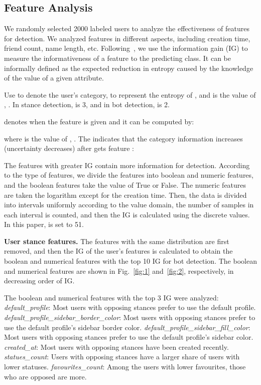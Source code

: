 \documentclass[10pt,twocolumn,letterpaper]{article}
\begin{document}
\subsection{Feature Analysis}
\label{sec:datapre-4}
We randomly selected 2000 labeled users to analyze the effectiveness of features for detection. We analyzed features in different aspects, including creation time, friend count, name length, etc. Following~\cite{Alpher10}, we use the information gain (IG) to measure the informativeness of a feature to the predicting class. It can be informally defined as the expected reduction in entropy caused by the knowledge of the value of a given attribute.

Use  to denote the user's category,  to represent the entropy of , and  is the value of , . In stance detection,  is 3, and in bot detection,  is 2.



 denotes  when the feature  is given and it can be computed by:



where  is the value of , . The  indicates that the category information increases (uncertainty decreases) after  gets feature :




The features with greater IG contain more information for detection. According to the type of features, we divide the features into boolean and numeric features, and the boolean features take the value of True or False. The numeric features are taken the logarithm except for the creation time. Then, the data is divided into  intervals uniformly according to the value domain, the number of samples in each interval is counted, and then the IG is calculated using the discrete values. In this paper,  is set to 51.


\noindent
\textbf{User stance features.}
The features with the same distribution are first removed, and then the IG of the user's features is calculated to obtain the boolean and numerical features with the top 10 IG for bot detection. The boolean and numerical features are shown in Fig.~\ref{fig:1} and~\ref{fig:2}, respectively, in decreasing order of IG.

The boolean and numerical features with the top 3 IG were analyzed: \emph{default\_profile}: Most users with opposing stances prefer to use the default profile. \emph{default\_profile\_sidebar\_border\_color}: Most users with opposing stances prefer to use the default profile's sidebar border color. \emph{default\_profile\_sidebar\_fill\_color}: Most users with opposing stances prefer to use the default profile's sidebar color. \emph{created\_at}: Most users with opposing stances have been created recently. \emph{statues\_count}: Users with opposing stances have a larger share of users with lower statuses. \emph{favourites\_count}: Among the users with lower favourites, those who are opposed are more.
\end{document}
